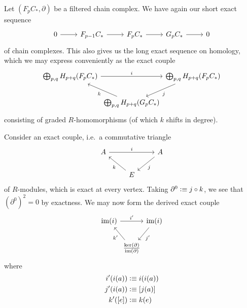 \documentclass{article}
\begin{document}
Let $(F_pC_\ast,\partial)$ be a filtered chain complex. We have again our
short exact sequence
\begin{equation*}
\begin{tikzcd}
0 \arrow[r] & F_{p-1} C_\ast \arrow[r] & F_p C_\ast \arrow[r] & G_p C_\ast \arrow[r] & 0
\end{tikzcd}
\end{equation*}
of chain complexes. This also gives us the long exact sequence on homology,
which we may express conveniently as the exact couple
\begin{equation*}
\begin{tikzcd}[column sep=0em]
\bigoplus_{p,q} H_{p+q}(F_pC_\ast) \arrow[rr,"i"] & & \bigoplus_{p,q} H_{p+q}(F_pC_\ast) \arrow[dl,"j"] \\
& \bigoplus_{p,q} H_{p+q}(G_p C_\ast) \arrow[ul,"k"]
\end{tikzcd}
\end{equation*}
consisting of graded $R$-homomorphisms (of which $k$ shifts in degree).

\begin{defn}
Consider an exact couple, i.e.~a commutative triangle
\begin{equation*}
\begin{tikzcd}
A \arrow[rr,"i"] & & A \arrow[dl,"j"] \\ & E \arrow[ul,"k"]
\end{tikzcd}
\end{equation*}
of $R$-modules, which is exact at every vertex. Taking $\partial^0\vcentcolon\equiv j\circ k$,
we see that $(\partial^0)^2=0$ by exactness. We may now form the derived exact couple
\begin{equation*}
\begin{tikzcd}[column sep=0]
\mathrm{im}(i) \arrow[rr,"i'"] & & \mathrm{im}(i) \arrow[dl,"j'"] \\
& \frac{\mathrm{ker}(\partial)}{\mathrm{im}(\partial)} \arrow[ul,"k'"]
\end{tikzcd}
\end{equation*}
where
\begin{align*}
i'(i(a)) & \vcentcolon\equiv i(i(a)) \\
j'(i(a)) & \vcentcolon\equiv [j(a)] \\
k'([e]) & \vcentcolon\equiv k(e)
\end{align*}
\end{defn}
\end{document}
